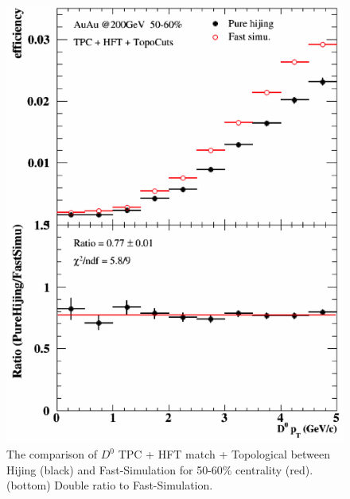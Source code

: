 \begin{figure}[htbp]
\begin{minipage}[htbp]{0.47\linewidth}
\centering
\includegraphics[width=1.0\textwidth,angle=0]{figure/Run14_D0HFT/50_60.png}
\caption{ The comparison of $D^0$ TPC + HFT match + Topological between Hijing (black) and Fast-Simulation for 50-60\% centrality (red). (bottom) Double ratio to Fast-Simulation.\label{50_60}}
\end{minipage}
\hfill
\begin{minipage}[htbp]{0.47\linewidth}
\centering

\end{minipage}
\end{figure}
